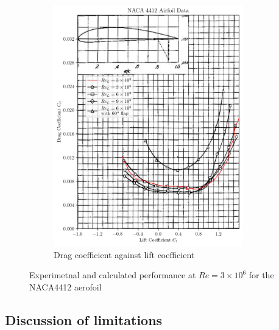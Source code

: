 \documentclass{article}
\begin{document}
\begin{figure}[H]
\begin{subfigure}{0.45\textwidth}
        \includegraphics[width=0.9\textwidth]{figures/NACA4412_drag_validation.png}
        \caption{Drag coefficient against lift coefficient}
        \label{fig:4412_drag_validation}
    \end{subfigure}
    \caption{Experimetnal and calculated performance at $Re = 3\times10^6$ for the NACA4412 aerofoil \cite{theory_wing_sections}}
\end{figure}

\subsection{Discussion of limitations}

\end{document}
